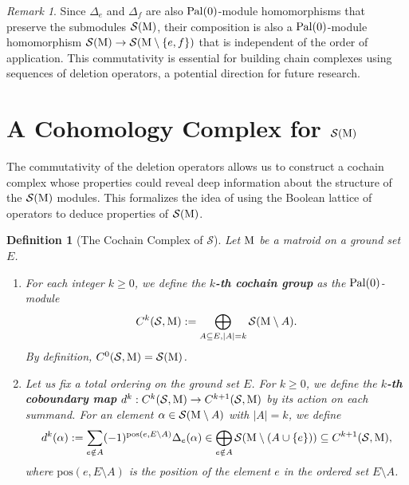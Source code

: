 \documentclass[11pt]{article}
\newcommand{\calS}{\mathcal{S}}
\newcommand{\M}{\normalfont\text{M}}
\newcommand{\pal}{\normalfont\text{Pal}}
\newtheorem{definition}[theorem]{Definition}
\theoremstyle{remark}
\newtheorem*{remark}{Remark} %
\begin{document}
\begin{remark}
    Since \(\Delta_e\) and \(\Delta_f\) are also \(\pal(0)\)-module homomorphisms that preserve the submodules \(\calS(\M)\), their composition is also a \(\pal(0)\)-module homomorphism \(\calS(\M) \to \calS(\M \setminus \{e,f\})\) that is independent of the order of application. This commutativity is essential for building chain complexes using sequences of deletion operators, a potential direction for future research.
\end{remark}
\section{A Cohomology Complex for \(\calS(\M)\)}

The commutativity of the deletion operators allows us to construct a cochain complex whose properties could reveal deep information about the structure of the \(\calS(\M)\) modules. This formalizes the idea of using the Boolean lattice of operators to deduce properties of \(\calS(\M)\).

\begin{definition}[The Cochain Complex of \(\calS\)]
Let \(\M\) be a matroid on a ground set \(E\).
\begin{enumerate}
    \item For each integer \(k \ge 0\), we define the \textbf{\(k\)-th cochain group} as the \(\pal(0)\)-module
    \[ C^k(\calS, \M) := \bigoplus_{A \subseteq E, |A|=k} \calS(\M \setminus A). \]
    By definition, \(C^0(\calS, \M) = \calS(\M)\).

    \item Let us fix a total ordering on the ground set \(E\). For \(k \ge 0\), we define the \textbf{\(k\)-th coboundary map} \(d^k: C^k(\calS, \M) \to C^{k+1}(\calS, \M)\) by its action on each summand. For an element \(\alpha \in \calS(\M \setminus A)\) with \(|A|=k\), we define
    \[ d^k(\alpha) := \sum_{e \notin A} (-1)^{\text{pos}(e, E \setminus A)} \Delta_e(\alpha) \in \bigoplus_{e \notin A} \calS(\M \setminus (A \cup \{e\})) \subseteq C^{k+1}(\calS, \M), \]
    where \(\text{pos}(e, E \setminus A)\) is the position of the element \(e\) in the ordered set \(E \setminus A\).
\end{enumerate}
\end{definition}
\end{document}
